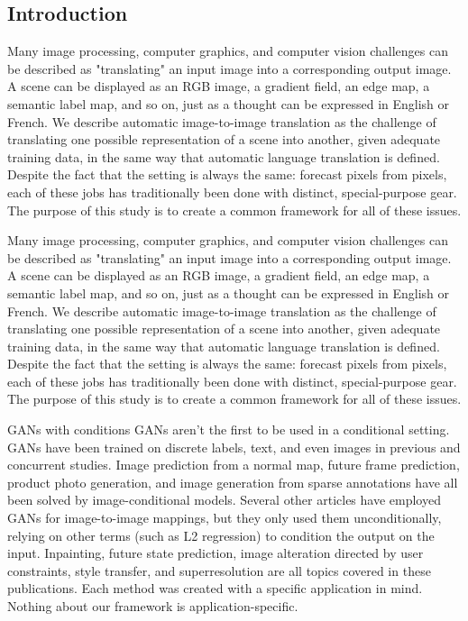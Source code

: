 


\subsection{Introduction}

\par Many image processing, computer graphics, and computer vision challenges can be described as "translating" an input image into a corresponding output image. A scene can be displayed as an RGB image, a gradient field, an edge map, a semantic label map, and so on, just as a thought can be expressed in English or French. We describe automatic image-to-image translation as the challenge of translating one possible representation of a scene into another, given adequate training data, in the same way that automatic language translation is defined. Despite the fact that the setting is always the same: forecast pixels from pixels, each of these jobs has traditionally been done with distinct, special-purpose gear. The purpose of this study is to create a common framework for all of these issues.

Many image processing, computer graphics, and computer vision challenges can be described as "translating" an input image into a corresponding output image. A scene can be displayed as an RGB image, a gradient field, an edge map, a semantic label map, and so on, just as a thought can be expressed in English or French. We describe automatic image-to-image translation as the challenge of translating one possible representation of a scene into another, given adequate training data, in the same way that automatic language translation is defined. Despite the fact that the setting is always the same: forecast pixels from pixels, each of these jobs has traditionally been done with distinct, special-purpose gear. The purpose of this study is to create a common framework for all of these issues.


GANs with conditions GANs aren't the first to be used in a conditional setting. GANs have been trained on discrete labels, text, and even images in previous and concurrent studies. Image prediction from a normal map, future frame prediction, product photo generation, and image generation from sparse annotations have all been solved by image-conditional models. Several other articles have employed GANs for image-to-image mappings, but they only used them unconditionally, relying on other terms (such as L2 regression) to condition the output on the input. Inpainting, future state prediction, image alteration directed by user constraints, style transfer, and superresolution are all topics covered in these publications. Each method was created with a specific application in mind. Nothing about our framework is application-specific.

